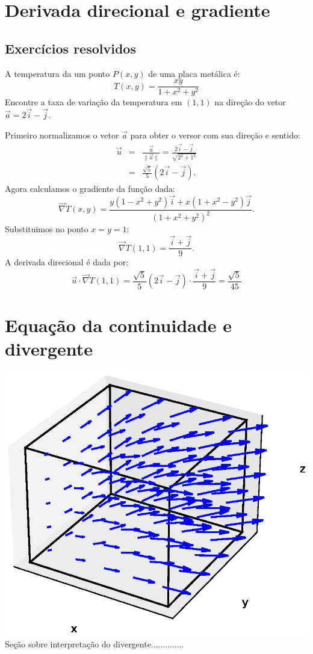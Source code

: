 \section{Derivada direcional e gradiente}


\subsection*{Exercícios resolvidos}
\begin{exeresol}
A temperatura da um ponto $P(x, y)$ de uma placa metálica é:
$$T(x, y) = \frac{xy}{1+x^2+y^2}$$
Encontre a taxa de variação da temperatura em $(1, 1)$ na direção do vetor $\vec{a}=2\vec{i}-\vec{j}$.
\end{exeresol}
\begin{resol}
Primeiro normalizamos o vetor $\vec{a}$ para obter o versor com sua direção e sentido:
\begin{eqnarray*}
\vec{u}&=&\frac{\vec{a}}{\|\vec{a}\|}=\frac{2\vec{i}-\vec{j}}{\sqrt{2^2+1^2}}\\
&=&\frac{\sqrt{5}}{5}\left(2\vec{i}-\vec{j}\right).
\end{eqnarray*}
Agora calculamos o gradiente da função dada:
$$\vec{\nabla}T(x, y) = \frac{y(1-x^2+y^2)\vec{i} + x(1+x^2-y^2)\vec{j}}{\left(1+x^2+y^2\right)^2}.$$
Substituimos no ponto $x=y=1$:
$$\vec{\nabla}T(1, 1) = \frac{\vec{i} + \vec{j}}{9}.$$
A derivada direcional é dada por:
$$\vec{u}\cdot\vec{\nabla}T(1,1) = \frac{\sqrt{5}}{5}\left(2\vec{i}-\vec{j}\right)\cdot \frac{\vec{i} + \vec{j}}{9}=\frac{\sqrt{5}}{45}$$
\end{resol}

\section{Equação da continuidade e divergente}
\includegraphics{cap_campos/figs/campo_com_cubo_divergente}
Seção sobre interpretação do divergente..............


